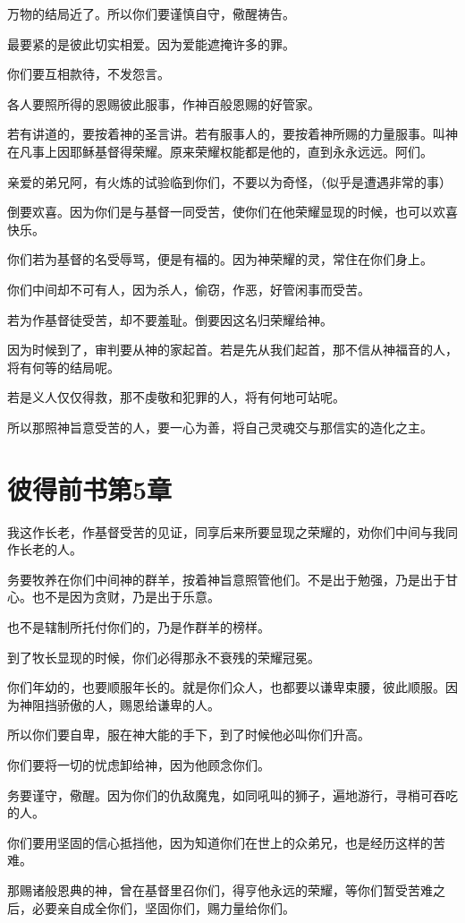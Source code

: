 \documentclass[12pt,oneside]{book}
\begin{document}
万物的结局近了。所以你们要谨慎自守，儆醒祷告。

最要紧的是彼此切实相爱。因为爱能遮掩许多的罪。

你们要互相款待，不发怨言。

各人要照所得的恩赐彼此服事，作神百般恩赐的好管家。

若有讲道的，要按着神的圣言讲。若有服事人的，要按着神所赐的力量服事。叫神在凡事上因耶稣基督得荣耀。原来荣耀权能都是他的，直到永永远远。阿们。

亲爱的弟兄阿，有火炼的试验临到你们，不要以为奇怪，（似乎是遭遇非常的事）

倒要欢喜。因为你们是与基督一同受苦，使你们在他荣耀显现的时候，也可以欢喜快乐。

你们若为基督的名受辱骂，便是有福的。因为神荣耀的灵，常住在你们身上。

你们中间却不可有人，因为杀人，偷窃，作恶，好管闲事而受苦。

若为作基督徒受苦，却不要羞耻。倒要因这名归荣耀给神。

因为时候到了，审判要从神的家起首。若是先从我们起首，那不信从神福音的人，将有何等的结局呢。

若是义人仅仅得救，那不虔敬和犯罪的人，将有何地可站呢。

所以那照神旨意受苦的人，要一心为善，将自己灵魂交与那信实的造化之主。

\chapter{彼得前书第5章}
我这作长老，作基督受苦的见证，同享后来所要显现之荣耀的，劝你们中间与我同作长老的人。

务要牧养在你们中间神的群羊，按着神旨意照管他们。不是出于勉强，乃是出于甘心。也不是因为贪财，乃是出于乐意。

也不是辖制所托付你们的，乃是作群羊的榜样。

到了牧长显现的时候，你们必得那永不衰残的荣耀冠冕。

你们年幼的，也要顺服年长的。就是你们众人，也都要以谦卑束腰，彼此顺服。因为神阻挡骄傲的人，赐恩给谦卑的人。

所以你们要自卑，服在神大能的手下，到了时候他必叫你们升高。

你们要将一切的忧虑卸给神，因为他顾念你们。

务要谨守，儆醒。因为你们的仇敌魔鬼，如同吼叫的狮子，遍地游行，寻梢可吞吃的人。

你们要用坚固的信心抵挡他，因为知道你们在世上的众弟兄，也是经历这样的苦难。

那赐诸般恩典的神，曾在基督里召你们，得亨他永远的荣耀，等你们暂受苦难之后，必要亲自成全你们，坚固你们，赐力量给你们。
\end{document}
